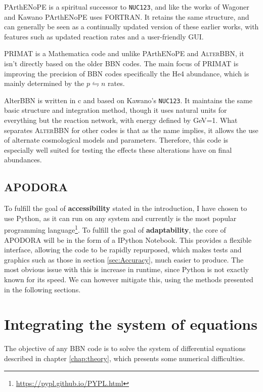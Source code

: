 PArthENoPE\cite{PArthENoPE} is a spiritual successor to \texttt{NUC123}, and like the works of Wagoner and Kawano PArthENoPE uses FORTRAN. It retains the same structure, and can generally be seen as a continually updated version of these earlier works, with features such as updated reaction rates and a user-friendly GUI.

PRIMAT\cite{PRIMAT} is a Mathematica code and unlike PArthENoPE and \textsc{AlterBBN}, it isn't directly based on the older BBN codes. The main focus of PRIMAT is improving the precision of BBN codes specifically the He4 abundance, which is mainly determined by the $p\leftrightharpoons n$ rates. 

AlterBBN\cite{AlterBBN} is written in c and based on Kawano's \texttt{NUC123}. It maintains the same basic structure and integration method, though it uses natural units for everything but the reaction network, with energy defined by GeV=1. What separates \textsc{AlterBBN} for other codes is that as the name implies, it allows the use of alternate cosmological models and parameters. Therefore, this code is especially well suited for testing the effects these alterations have on final abundances.

\subsection{APODORA}
To fulfill the goal of \textbf{accessibility} stated in the introduction, I have chosen to use Python, as it can run on any system and currently is the most popular programming language\footnote{\url{https://pypl.github.io/PYPL.html}}. To fulfill the goal of \textbf{adaptability}, the core of APODORA will be in the form of a IPython Notebook\cite{IPython:2007}. This provides a flexible interface, allowing the code to be rapidly repurposed, which makes tests and graphics such as those in section \ref{sec:Accuracy}, much easier to produce. 
The most obvious issue with this is increase in runtime, since Python is not exactly known for its speed. We can however mitigate this, using the methods presented in the following sections.



\section{Integrating the system of equations}
\label{sec:Solving}

The objective of any BBN code is to solve the system of differential equations described in chapter \ref{chap:theory}, which presents some numerical difficulties. 

